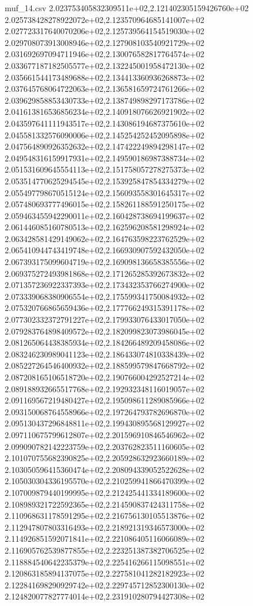 \begin{filecontents*}{muf_14.csv}
2.023753405832309511e+02,2.121402305159426760e+02
2.025738428278922072e+02,2.123570964685141007e+02
2.027723317640070206e+02,2.125739564154519030e+02
2.029708073913008946e+02,2.127908103540921729e+02
2.031692697094711946e+02,2.130076582817764574e+02
2.033677187182505577e+02,2.132245001958472130e+02
2.035661544173489688e+02,2.134413360936268873e+02
2.037645768064722063e+02,2.136581659724761266e+02
2.039629858853430733e+02,2.138749898297173786e+02
2.041613816536856234e+02,2.140918076626921902e+02
2.043597641111943517e+02,2.143086194687375610e+02
2.045581332576090006e+02,2.145254252452095898e+02
2.047564890926352632e+02,2.147422249894298147e+02
2.049548316159917931e+02,2.149590186987388734e+02
2.051531609645554113e+02,2.151758057278275373e+02
2.053514770625294545e+02,2.153925847854334279e+02
2.055497798670515124e+02,2.156093558301645317e+02
2.057480693777496015e+02,2.158261188591250175e+02
2.059463455942290011e+02,2.160428738694199637e+02
2.061446085160780513e+02,2.162596208581298924e+02
2.063428581429149062e+02,2.164763598223762529e+02
2.065410944743419748e+02,2.166930907592432050e+02
2.067393175099604719e+02,2.169098136658385556e+02
2.069375272493981868e+02,2.171265285392673832e+02
2.071357236922337393e+02,2.173432353766274900e+02
2.073339068380906554e+02,2.175599341750084932e+02
2.075320766865659436e+02,2.177766249315391178e+02
2.077302332372791227e+02,2.179933076433017050e+02
2.079283764898409572e+02,2.182099823073986045e+02
2.081265064438385934e+02,2.184266489209458086e+02
2.083246230989041123e+02,2.186433074810338439e+02
2.085227264546400932e+02,2.188599579847668792e+02
2.087208165106518720e+02,2.190766004292527214e+02
2.089188932665517768e+02,2.192932348116019057e+02
2.091169567219480427e+02,2.195098611289085966e+02
2.093150068764558966e+02,2.197264793782696870e+02
2.095130437296848811e+02,2.199430895568129927e+02
2.097110675799612807e+02,2.201596910846546962e+02
2.099090782142223759e+02,2.203762823511160605e+02
2.101070755682390825e+02,2.205928632923660189e+02
2.103050596415360474e+02,2.208094339052522628e+02
2.105030304336195570e+02,2.210259941866470399e+02
2.107009879440199995e+02,2.212425441334189600e+02
2.108989321722592365e+02,2.214590837424311758e+02
2.110968631178591295e+02,2.216756130105513876e+02
2.112947807803316493e+02,2.218921319346573000e+02
2.114926851592071841e+02,2.221086405116066089e+02
2.116905762539877855e+02,2.223251387382706525e+02
2.118884540642235379e+02,2.225416266115098551e+02
2.120863185894137075e+02,2.227581041282182923e+02
2.122841698290929742e+02,2.229745712852300130e+02
2.124820077827774014e+02,2.231910280794427308e+02

\end{filecontents*}
